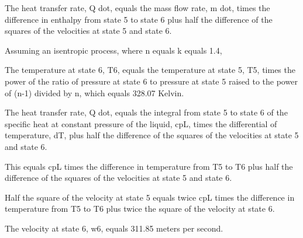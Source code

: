The heat transfer rate, Q dot, equals the mass flow rate, m dot, times the difference in enthalpy from state 5 to state 6 plus half the difference of the squares of the velocities at state 5 and state 6.

Assuming an isentropic process, where n equals k equals 1.4,

The temperature at state 6, T6, equals the temperature at state 5, T5, times the power of the ratio of pressure at state 6 to pressure at state 5 raised to the power of (n-1) divided by n, which equals 328.07 Kelvin.

The heat transfer rate, Q dot, equals the integral from state 5 to state 6 of the specific heat at constant pressure of the liquid, cpL, times the differential of temperature, dT, plus half the difference of the squares of the velocities at state 5 and state 6.

This equals cpL times the difference in temperature from T5 to T6 plus half the difference of the squares of the velocities at state 5 and state 6.

Half the square of the velocity at state 5 equals twice cpL times the difference in temperature from T5 to T6 plus twice the square of the velocity at state 6.

The velocity at state 6, w6, equals 311.85 meters per second.